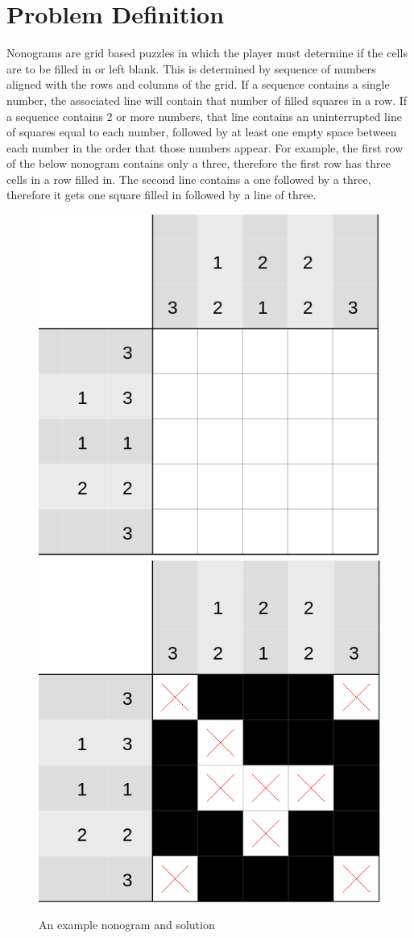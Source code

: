 \documentclass[12pt, a4paper]{article}
\begin{document}
\nocite{*}



\tableofcontents
\newpage
{}
\setcounter{lastroman}{\value{page}}
\maketitle
\section{Problem Definition}
    Nonograms are grid based puzzles in which the player must determine if the cells are to be filled in or left blank. This is determined by sequence of numbers aligned with the rows and columns of the grid. If a sequence contains a single number, the associated line will contain that number of filled squares in a row. If a sequence contains 2 or more numbers, that line contains an uninterrupted line of squares equal to each number, followed by at least one empty space between each number in the order that those numbers appear. For example, the first row of the below nonogram contains only a three, therefore the first row has three cells in a row filled in. The second line contains a one followed by a  three, therefore it gets one square filled in followed by a line of three.


\begin{figure}[H]
    \centering
    {\includegraphics[width=0.4\linewidth]{fig/nonogram.png}}\hfill
    {\includegraphics[width=0.4\linewidth]{fig/canvas.png}}
        \caption{An example nonogram and solution}
    \label{fig:enter-label}
\end{figure}
\end{document}
